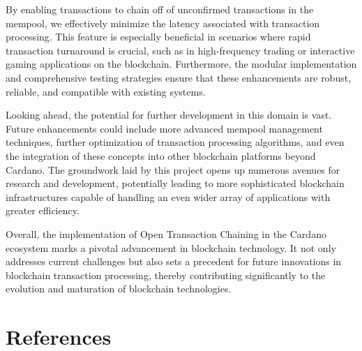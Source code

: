 \documentclass[11pt]{article}
\begin{document}
By enabling transactions to chain off of unconfirmed transactions in the mempool, we effectively minimize the latency associated with transaction processing. This feature is especially beneficial in scenarios where rapid transaction turnaround is crucial, such as in high-frequency trading or interactive gaming applications on the blockchain. Furthermore, the modular implementation and comprehensive testing strategies ensure that these enhancements are robust, reliable, and compatible with existing systems.

Looking ahead, the potential for further development in this domain is vast. Future enhancements could include more advanced mempool management techniques, further optimization of transaction processing algorithms, and even the integration of these concepts into other blockchain platforms beyond Cardano. The groundwork laid by this project opens up numerous avenues for research and development, potentially leading to more sophisticated blockchain infrastructures capable of handling an even wider array of applications with greater efficiency.

Overall, the implementation of Open Transaction Chaining in the Cardano ecosystem marks a pivotal advancement in blockchain technology. It not only addresses current challenges but also sets a precedent for future innovations in blockchain transaction processing, thereby contributing significantly to the evolution and maturation of blockchain technologies.

\section{References}

\printbibliography
\end{document}
